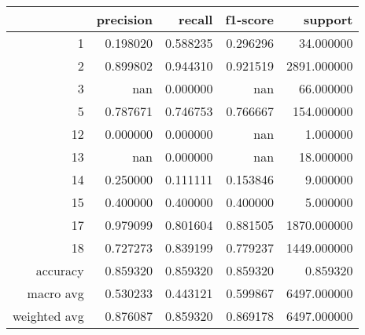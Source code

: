\begin{tabular}{rrrrr}
\toprule
 & precision & recall & f1-score & support \\
\midrule
1 & 0.198020 & 0.588235 & 0.296296 & 34.000000 \\
2 & 0.899802 & 0.944310 & 0.921519 & 2891.000000 \\
3 & nan & 0.000000 & nan & 66.000000 \\
5 & 0.787671 & 0.746753 & 0.766667 & 154.000000 \\
12 & 0.000000 & 0.000000 & nan & 1.000000 \\
13 & nan & 0.000000 & nan & 18.000000 \\
14 & 0.250000 & 0.111111 & 0.153846 & 9.000000 \\
15 & 0.400000 & 0.400000 & 0.400000 & 5.000000 \\
17 & 0.979099 & 0.801604 & 0.881505 & 1870.000000 \\
18 & 0.727273 & 0.839199 & 0.779237 & 1449.000000 \\
accuracy & 0.859320 & 0.859320 & 0.859320 & 0.859320 \\
macro avg & 0.530233 & 0.443121 & 0.599867 & 6497.000000 \\
weighted avg & 0.876087 & 0.859320 & 0.869178 & 6497.000000 \\
\bottomrule
\end{tabular}
